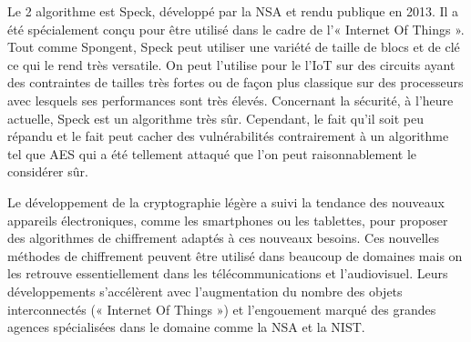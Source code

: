 Le 2 algorithme est Speck, développé par la NSA et rendu publique en
2013. Il a été spécialement conçu pour être utilisé dans le cadre de l'«
Internet Of Things ». Tout comme Spongent, Speck peut utiliser une variété de
taille de blocs et de clé ce qui le rend très versatile. On peut l'utilise pour
le l'IoT sur des circuits ayant des contraintes de tailles très fortes ou de
façon plus classique sur des processeurs avec lesquels ses performances sont
très élevés. Concernant la sécurité, à l'heure actuelle, Speck est un algorithme
très sûr. Cependant, le fait qu'il soit peu répandu et le fait peut cacher des
vulnérabilités contrairement à un algorithme tel que AES qui a été tellement
attaqué que l'on peut raisonnablement le considérer sûr.


Le développement de la cryptographie légère a suivi la tendance des nouveaux
appareils électroniques, comme les smartphones ou les tablettes, pour proposer
des algorithmes de chiffrement adaptés à ces nouveaux besoins. Ces nouvelles
méthodes de chiffrement peuvent être utilisé dans beaucoup de domaines mais on
les retrouve essentiellement dans les télécommunications et l'audiovisuel.
Leurs développements s'accélèrent avec l'augmentation du nombre des objets
interconnectés (« Internet Of Things ») et l'engouement marqué des grandes
agences spécialisées dans le domaine comme la NSA et la NIST.
